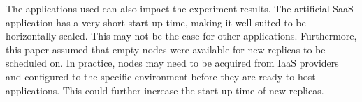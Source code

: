 The applications used can also impact the experiment results. The artificial SaaS application has a very short start-up time, making it well suited to be horizontally scaled. This may not be the case for other applications. Furthermore, this paper assumed that empty nodes were available for new replicas to be scheduled on. In practice, nodes may need to be acquired from IaaS providers and configured to the specific environment before they are ready to host applications. This could further increase the start-up time of new replicas. 